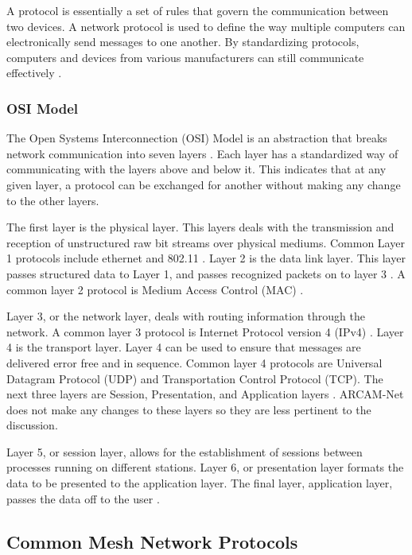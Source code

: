 A protocol is essentially a set of rules that govern the communication between two devices. A network protocol is used to define the way multiple computers can electronically send messages to one another. By standardizing protocols, computers and devices from various manufacturers can still communicate effectively \cite{6840086} \cite{0029}. 

\subsubsection{OSI Model}

The Open Systems Interconnection (OSI) Model is an abstraction that breaks network communication into seven layers \cite{6840086} \cite{0030}. Each layer has a standardized way of communicating with the layers above and below it. This indicates that at any given layer, a protocol can be exchanged for another without making any change to the other layers\cite{6840086}. 

The first layer is the physical layer. This layers deals with the transmission and reception of unstructured raw bit streams over physical mediums. Common Layer 1 protocols include ethernet and 802.11 \cite{6014631} \cite{0030}. Layer 2 is the data link layer. This layer passes structured data to Layer 1, and passes recognized packets on to layer 3 \cite{6840086}. A common layer 2 protocol is Medium Access Control (MAC) \cite{6014631} \cite{0030}. 

Layer 3, or the network layer, deals with routing information through the network. A common layer 3 protocol is Internet Protocol version 4 (IPv4) \cite{6014631} \cite{0031}. Layer 4 is the transport layer. Layer 4 can be used to ensure that messages are delivered error free and in sequence. Common layer 4 protocols are Universal Datagram Protocol (UDP) and Transportation Control Protocol (TCP). The next three layers are Session, Presentation, and Application layers \cite{6840086} \cite{0030}. ARCAM-Net does not make any changes to these layers so they are less pertinent to the discussion. 

Layer 5, or session layer, allows for the establishment of sessions between processes running on different stations. Layer 6, or presentation layer formats the data to be presented to the application layer. The final layer, application layer, passes the data off to the user \cite{6840086}. 

\subsection{Common Mesh Network Protocols}

